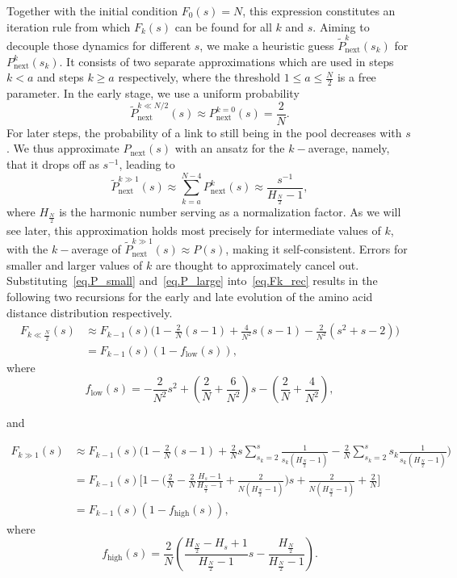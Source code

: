 \documentclass[10pt]{iopart}
\newcommand{\Pin}{P_{\mathrm{next}}}
\newcommand{\fhigh}{f_{\mathrm{high}}}
\newcommand{\flow}{f_{\mathrm{low}}}
\begin{document}
Together with the initial condition $F_0(s)=N$, this expression constitutes an iteration rule from which $F_k(s)$ can be found for all $k$ and $s$. Aiming to decouple those dynamics for different $s$, we make a heuristic guess $\tilde{P}_{\text{next}}^k(s_k)$ for $\Pin^k(s_k)$. It consists of two separate approximations which are used in steps $k<a$ and steps $k\geq a$ respectively, where the threshold $1\leq a\leq \frac{N}{2}$ is a free parameter. In the early stage, we use a uniform probability
\begin{equation}
    \tilde{P}_{\text{next}}^{k\ll N/2}(s)\approx \Pin^{k=0}(s)=\frac{2}{N}.
    \label{eq.P_small}
\end{equation}
For later steps, the probability of a link to still being in the pool decreases with $s$. We thus approximate $\Pin(s)$ with an ansatz for the $k-$average, namely, that it drops off as $s^{-1}$, leading to
\begin{equation}
    \tilde{P}_{\text{next}}^{k\gg 1}(s)\approx \sum_{k=a}^{N-4}\Pin^{k}(s)
    \approx \frac{s^{-1}}{ H_{\frac{N}{2}}-1},
    \label{eq.P_large}
\end{equation}
where $H_{\frac{N}{2}}$ is the harmonic number serving as a normalization factor. 
As we will see later, this approximation holds most precisely for intermediate values of $k$, with the $k-$average of $\tilde{P}_{\text{next}}^{k\gg 1}(s)\approx P(s)$, making it self-consistent. Errors for smaller and larger values of $k$ are thought to approximately cancel out.
Substituting~\ref{eq.P_small} and~\ref{eq.P_large} into~\ref{eq.Fk_rec} results in the following two recursions for the early and late evolution of the amino acid distance distribution respectively.
\begin{align}
   F_{k\ll \frac{N}{2}}(s)&\approx 
   F_{k-1}(s)\Big(1-\frac{2}{N} (s-1) 
   +\frac{4}{N^2} s (s-1)\nonumber -\frac{2}{N^2}(s^2+s-2)\Big)\nonumber \\
   &=F_{k-1}(s)(1-\flow(s)),
   \label{eq.Fk_rec_low}
\end{align}
where 
\[\flow(s)=-\frac{2}{N^2}s^2+\left(\frac{2}{N}+\frac{6}{N^2}\right)s-\left(\frac{2}{N}+\frac{4}{N^2}\right),\]

and

\begin{align}
   F_{k\gg1}(s)&\approx F_{k-1}(s)\Big(1-\frac{2}{N} (s-1) \nonumber+\frac{2}{N} s \sum_{s_k=2}^{s}\frac{1}{s_k(H_{\frac{N}{2}}-1)}\nonumber-\frac{2}{N} \sum_{s_k=2}^{s} s_k \frac{1}{s_k(H_{\frac{N}{2}}-1)}\Big)\nonumber \\
   &=F_{k-1}(s)\bigg[1 -\Big(\frac{2}{N}-\frac{2}{N}\frac{H_{s}-1}{H_{\frac{N}{2}}-1} \nonumber +\frac{2}{N(H_{\frac{N}{2}}-1)}\Big)s \nonumber + \frac{2}{N(H_{\frac{N}{2}}-1)} + \frac{2}{N}\bigg]\nonumber \\
   &=F_{k-1}(s)(1-\fhigh(s)),
   \label{eq.Fk_rec_high}
\end{align}
where 
\[\fhigh(s)=\frac{2}{N}\left(\frac{H_{\frac{N}{2}}-H_{s}+1}{H_{\frac{N}{2}}-1}s-\frac{H_{\frac{N}{2}}}{H_{\frac{N}{2}}-1}\right).\]
\end{document}
